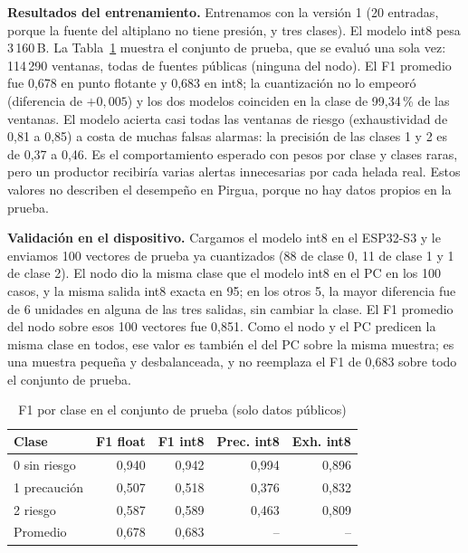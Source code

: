 \documentclass[conference]{IEEEtran}
\begin{document}
\textbf{Resultados del entrenamiento.} Entrenamos con la versi\'on 1 (20 entradas, porque la fuente del altiplano no tiene presi\'on, y tres clases). El modelo int8 pesa 3\,160\,B. La Tabla~\ref{tab:f1} muestra el conjunto de prueba, que se evalu\'o una sola vez: 114\,290 ventanas, todas de fuentes p\'ublicas (ninguna del nodo). El F1 promedio fue 0,678 en punto flotante y 0,683 en int8; la cuantizaci\'on no lo empeor\'o (diferencia de $+0{,}005$) y los dos modelos coinciden en la clase de 99,34\,\% de las ventanas. El modelo acierta casi todas las ventanas de riesgo (exhaustividad de 0,81 a 0,85) a costa de muchas falsas alarmas: la precisi\'on de las clases 1 y 2 es de 0,37 a 0,46. Es el comportamiento esperado con pesos por clase y clases raras, pero un productor recibir\'ia varias alertas innecesarias por cada helada real. Estos valores no describen el desempe\~no en Pirgua, porque no hay datos propios en la prueba.

\textbf{Validaci\'on en el dispositivo.} Cargamos el modelo int8 en el ESP32-S3 y le enviamos 100 vectores de prueba ya cuantizados (88 de clase 0, 11 de clase 1 y 1 de clase 2). El nodo dio la misma clase que el modelo int8 en el PC en los 100 casos, y la misma salida int8 exacta en 95; en los otros 5, la mayor diferencia fue de 6 unidades en alguna de las tres salidas, sin cambiar la clase. El F1 promedio del nodo sobre esos 100 vectores fue 0,851. Como el nodo y el PC predicen la misma clase en todos, ese valor es tambi\'en el del PC sobre la misma muestra; es una muestra peque\~na y desbalanceada, y no reemplaza el F1 de 0,683 sobre todo el conjunto de prueba.

\begin{table}[t]
\caption{F1 por clase en el conjunto de prueba (solo datos p\'ublicos)}
\label{tab:f1}
\centering
\begin{tabular}{@{}lrrrr@{}}
\toprule
Clase & F1 float & F1 int8 & Prec. int8 & Exh. int8 \\
\midrule
0 sin riesgo & 0,940 & 0,942 & 0,994 & 0,896 \\
1 precauci\'on & 0,507 & 0,518 & 0,376 & 0,832 \\
2 riesgo & 0,587 & 0,589 & 0,463 & 0,809 \\
Promedio & 0,678 & 0,683 & -- & -- \\
\bottomrule
\end{tabular}
\end{table}
\end{document}
